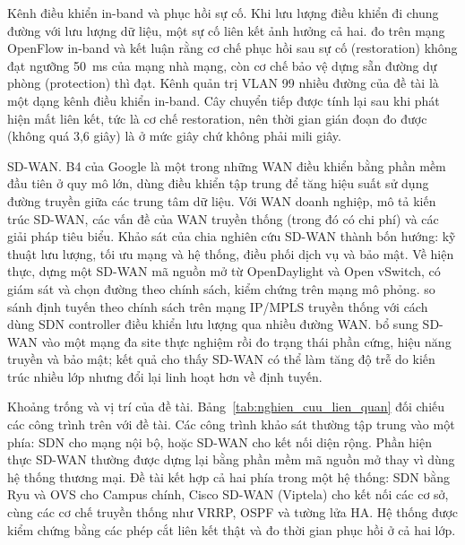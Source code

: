 Kênh điều khiển in-band và phục hồi sự cố. Khi lưu lượng điều khiển đi chung đường với lưu lượng dữ liệu, một sự cố liên kết ảnh hưởng cả hai. \citet{sharma2013inband} đo trên mạng OpenFlow in-band và kết luận rằng cơ chế phục hồi sau sự cố (restoration) không đạt ngưỡng 50~ms của mạng nhà mạng, còn cơ chế bảo vệ dựng sẵn đường dự phòng (protection) thì đạt. Kênh quản trị VLAN 99 nhiều đường của đề tài là một dạng kênh điều khiển in-band. Cây chuyển tiếp được tính lại sau khi phát hiện mất liên kết, tức là cơ chế restoration, nên thời gian gián đoạn đo được (không quá 3,6 giây) là ở mức giây chứ không phải mili giây.

SD-WAN. B4 của Google \citep{jain2013b4} là một trong những WAN điều khiển bằng phần mềm đầu tiên ở quy mô lớn, dùng điều khiển tập trung để tăng hiệu suất sử dụng đường truyền giữa các trung tâm dữ liệu. Với WAN doanh nghiệp, \citet{yang2019sdwan} mô tả kiến trúc SD-WAN, các vấn đề của WAN truyền thống (trong đó có chi phí) và các giải pháp tiêu biểu. Khảo sát của \citet{fu2024sdwan} chia nghiên cứu SD-WAN thành bốn hướng: kỹ thuật lưu lượng, tối ưu mạng và hệ thống, điều phối dịch vụ và bảo mật. Về hiện thực, \citet{troia2020sdwan} dựng một SD-WAN mã nguồn mở từ OpenDaylight và Open vSwitch, có giám sát và chọn đường theo chính sách, kiểm chứng trên mạng mô phỏng. \citet{seremet2019mpls} so sánh định tuyến theo chính sách trên mạng IP/MPLS truyền thống với cách dùng SDN controller điều khiển lưu lượng qua nhiều đường WAN. \citet{sun2024sdwan} bổ sung SD-WAN vào một mạng đa site thực nghiệm rồi đo trạng thái phần cứng, hiệu năng truyền và bảo mật; kết quả cho thấy SD-WAN có thể làm tăng độ trễ do kiến trúc nhiều lớp nhưng đổi lại linh hoạt hơn về định tuyến.

Khoảng trống và vị trí của đề tài. Bảng~\ref{tab:nghien_cuu_lien_quan} đối chiếu các công trình trên với đề tài. Các công trình khảo sát thường tập trung vào một phía: SDN cho mạng nội bộ, hoặc SD-WAN cho kết nối diện rộng. Phần hiện thực SD-WAN thường được dựng lại bằng phần mềm mã nguồn mở thay vì dùng hệ thống thương mại. Đề tài kết hợp cả hai phía trong một hệ thống: SDN bằng Ryu và OVS cho Campus chính, Cisco SD-WAN (Viptela) cho kết nối các cơ sở, cùng các cơ chế truyền thống như VRRP, OSPF và tường lửa HA. Hệ thống được kiểm chứng bằng các phép cắt liên kết thật và đo thời gian phục hồi ở cả hai lớp.

